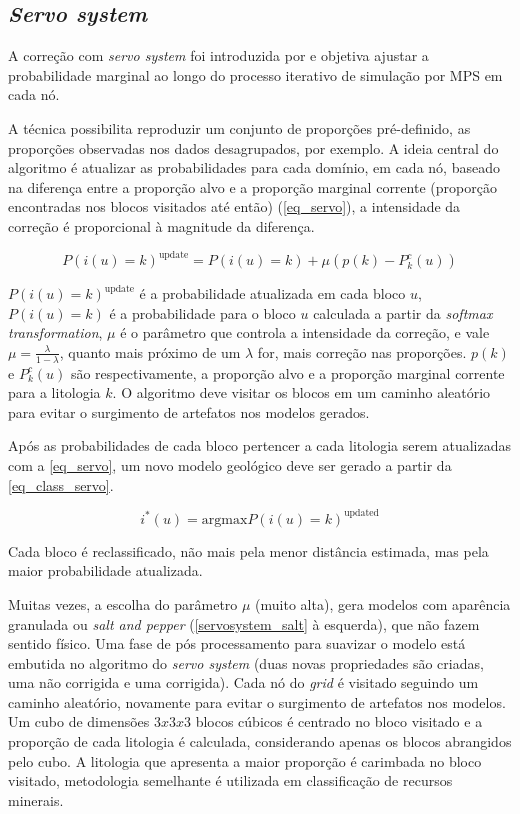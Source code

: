 \subsection{\textit{Servo system}}

A correção com \textit{servo system} foi introduzida por  e objetiva ajustar a probabilidade marginal ao longo do processo iterativo de simulação por MPS em cada nó.

A técnica possibilita reproduzir um conjunto de proporções pré-definido, as proporções observadas nos dados desagrupados, por exemplo. A ideia central do algoritmo é atualizar as probabilidades para cada domínio, em cada nó, baseado na diferença entre a proporção alvo e a proporção marginal corrente (proporção encontradas nos blocos visitados até então) (\autoref{eq_servo}), a intensidade da correção é proporcional à magnitude da diferença.

\begin{equation}
	P(i(u)=k)^\text{update}=P(i(u)=k)+\mu(p(k)-P_k^c(u))
	\label{eq_servo}
\end{equation}

$P(i(u)=k)^\text{update}$ é a probabilidade atualizada em cada bloco $u$, $P(i(u)=k)$ é a probabilidade para o bloco $u$ calculada a partir da \textit{softmax transformation}, $\mu$ é o parâmetro que controla a intensidade da correção, e vale $\mu=\frac{\lambda}{1-\lambda}$, quanto mais próximo de um $\lambda$ for, mais correção nas proporções. $p(k)$ e $P_k^c(u)$ são respectivamente, a proporção alvo e a proporção marginal corrente para a litologia $k$. O algoritmo deve visitar os blocos em um caminho aleatório para evitar o surgimento de artefatos nos modelos gerados.

Após as probabilidades de cada bloco pertencer a cada litologia serem atualizadas com a \autoref{eq_servo}, um novo modelo geológico deve ser gerado a partir da \autoref{eq_class_servo}.

\begin{equation}
	i^*(u)=\text{argmax}P(i(u)=k)^\text{updated}
    \label{eq_class_servo}
\end{equation}

Cada bloco é reclassificado, não mais pela menor distância estimada, mas pela maior probabilidade atualizada.

Muitas vezes, a escolha do parâmetro $\mu$ (muito alta), gera modelos com aparência granulada ou \textit{salt and pepper} (\autoref{servosystem_salt} à esquerda), que não fazem sentido físico. Uma fase de pós processamento para suavizar o modelo está embutida no algoritmo do \textit{servo system} (duas novas propriedades são criadas, uma não corrigida e uma corrigida). Cada nó do \textit{grid} é visitado seguindo um caminho aleatório, novamente para evitar o surgimento de artefatos nos modelos. Um cubo de dimensões $3x3x3$ blocos cúbicos é centrado no bloco visitado e a proporção de cada litologia é calculada, considerando apenas os blocos abrangidos pelo cubo. A litologia que apresenta a maior proporção é carimbada no bloco visitado, metodologia semelhante é utilizada em classificação de recursos minerais.

